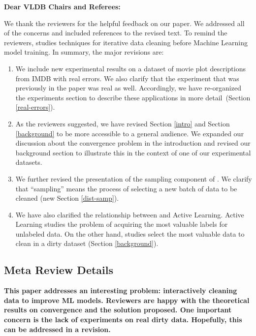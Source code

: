 {\noindent \normalsize \bf Dear VLDB Chairs and Referees: }

\vspace{.5em}

We thank the reviewers for the helpful feedback on our paper. 
We addressed all of the concerns and included references to the revised text. 
To remind the reviewers, \sys studies techniques for iterative data cleaning before Machine Learning model training.
In summary, the major revisions are:

\begin{enumerate}
\item We include new experimental results on a dataset of movie plot descriptions from IMDB with real errors. We also clarify that the experiment that was previously in the paper was real as well. Accordingly, we have re-organized the experiments section to describe these applications in more detail~(Section \ref{real-errors}).

\item As the reviewers suggested, we have revised Section \ref{intro} and Section \ref{background} to be more accessible to a general audience. We expanded our discussion about the convergence problem in the introduction and revised our background section to illustrate this in the context of one of our experimental datasets.

\item We further revised the presentation of the sampling component of \sys. We clarify that ``sampling'' means the process of selecting a new batch of data to be cleaned (new Section \ref{dist-samp}). 

\item We have also clarified the relationship between \sys and Active Learning. Active Learning studies the problem of acquiring the most valuable labels for unlabeled data. On the other hand, \sys studies select the most valuable data to clean in a dirty dataset (Section \ref{background}). 

\end{enumerate}

\subsection*{Meta Review Details} 

\noindent\noindent \textbf{This paper addresses an interesting problem: interactively cleaning data to improve ML models. Reviewers are happy with the theoretical results on convergence and the solution proposed. One important concern is the lack of experiments on real dirty data. Hopefully, this can be addressed in a revision.}

